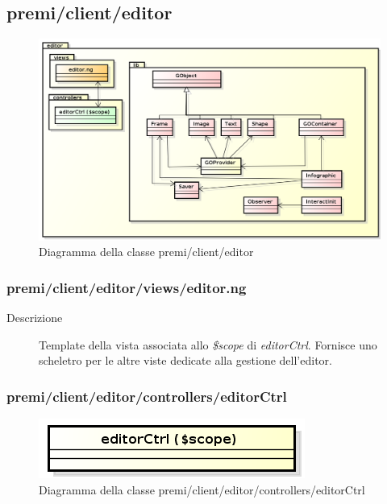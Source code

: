 \clearpage
\subsection{premi/client/editor}
\begin{figure}[h]
\begin{center}
\includegraphics[scale=0.40]{img/diapkg/editor.png}
\caption{Diagramma della classe premi/client/editor}
\end{center}
\end{figure}

\subsubsection{premi/client/editor/views/editor.ng}

\begin{description}
\item[Descrizione] \hfill
	Template della vista associata allo \textit{\$scope} di \textit{editorCtrl}. Fornisce uno scheletro per le altre viste dedicate alla gestione dell'editor. 
\end{description}


\subsubsection{premi/client/editor/controllers/editorCtrl}
\begin{figure}[h]
\begin{center}
\includegraphics[scale=0.40]{img/diacla/editorCtrl.png}
\caption{Diagramma della classe premi/client/editor/controllers/editorCtrl}
\end{center}
\end{figure}

